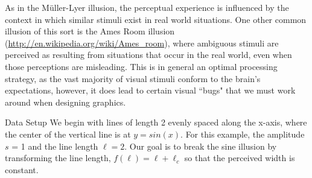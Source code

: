 \documentclass[11pt]{article}\usepackage{graphicx, color}
\begin{document}
As in the M\"uller-Lyer illusion, the perceptual experience is influenced by the context in which similar stimuli exist in real world situations. One other common illusion of this sort is the Ames Room illusion (\url{http://en.wikipedia.org/wiki/Ames_room}), where ambiguous stimuli are perceived as resulting from situations that occur in the real world, even when those perceptions are misleading. This is in general an optimal processing strategy, as the vast majority of visual stimuli conform to the brain's expectations, however, it does lead to certain visual ``bugs" that we must work around when designing graphics.
 
\clearpage
\begin{subsection}{Data Setup}
We begin with lines of length 2 evenly spaced along the x-axis, where the center of the vertical line is at $y = sin(x)$. For this example, the amplitude $s$ = 1 and the line length $\ell = 2$. Our goal is to break the sine illusion by transforming the line length, $f(\ell) = \ell + \ell_c$ so that the perceived width is constant. 

\end{subsection}
\end{document}
